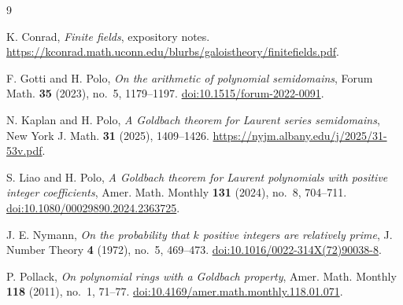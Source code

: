 \documentclass[11pt]{amsart}
\theoremstyle{definition}
\theoremstyle{remark}
\begin{document}
\begin{thebibliography}{9}

K. Conrad,
\emph{Finite fields}, expository notes.
\url{https://kconrad.math.uconn.edu/blurbs/galoistheory/finitefields.pdf}.

F. Gotti and H. Polo,
\emph{On the arithmetic of polynomial semidomains},
Forum Math. \textbf{35} (2023), no.~5, 1179--1197.
\href{https://doi.org/10.1515/forum-2022-0091}{doi:10.1515/forum-2022-0091}.

N. Kaplan and H. Polo,
\emph{A Goldbach theorem for Laurent series semidomains},
New York J. Math. \textbf{31} (2025), 1409--1426.
\url{https://nyjm.albany.edu/j/2025/31-53v.pdf}.

S. Liao and H. Polo,
\emph{A Goldbach theorem for Laurent polynomials with positive integer coefficients},
Amer. Math. Monthly \textbf{131} (2024), no.~8, 704--711.
\href{https://doi.org/10.1080/00029890.2024.2363725}{doi:10.1080/00029890.2024.2363725}.

J. E. Nymann,
\emph{On the probability that $k$ positive integers are relatively prime},
J. Number Theory \textbf{4} (1972), no.~5, 469--473.
\href{https://doi.org/10.1016/0022-314X(72)90038-8}{doi:10.1016/0022-314X(72)90038-8}.

P. Pollack,
\emph{On polynomial rings with a Goldbach property},
Amer. Math. Monthly \textbf{118} (2011), no.~1, 71--77.
\href{https://doi.org/10.4169/amer.math.monthly.118.01.071}{doi:10.4169/amer.math.monthly.118.01.071}.

\end{thebibliography}
\end{document}
